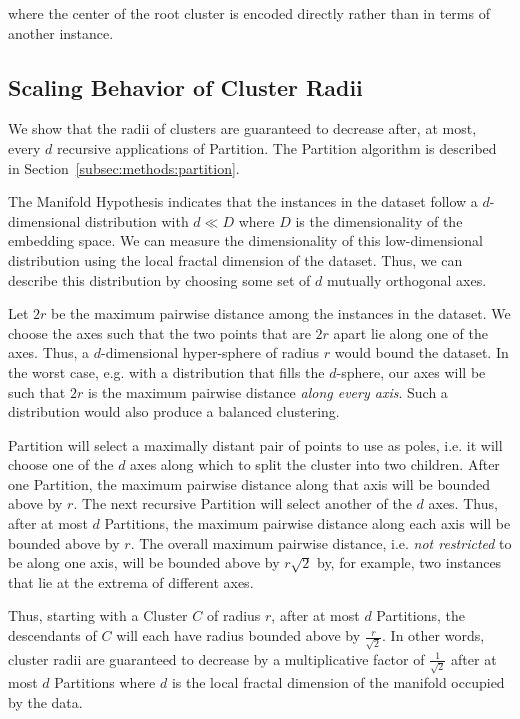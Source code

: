 where the center of the root cluster is encoded directly rather than in terms of another instance.


\subsection{Scaling Behavior of Cluster Radii}
\label{subsec:methods:radii-scaling-behavior}

We show that the radii of clusters are guaranteed to decrease after, at most, every $d$ recursive applications of Partition.
The Partition algorithm is described in Section~\ref{subsec:methods:partition}.

The Manifold Hypothesis indicates that the instances in the dataset follow a $d$-dimensional distribution with $d \ll D$ where $D$ is the dimensionality of the embedding space.
We can measure the dimensionality of this low-dimensional distribution using the local fractal dimension of the dataset.
Thus, we can describe this distribution by choosing some set of $d$ mutually orthogonal axes.

Let $2r$ be the maximum pairwise distance among the instances in the dataset.
We choose the axes such that the two points that are $2r$ apart lie along one of the axes.
Thus, a $d$-dimensional hyper-sphere of radius $r$ would bound the dataset.
In the worst case, e.g. with a distribution that fills the $d$-sphere, our axes will be such that $2r$ is the maximum pairwise distance \textit{along every axis}.
Such a distribution would also produce a balanced clustering.

Partition will select a maximally distant pair of points to use as poles, i.e. it will choose one of the $d$ axes along which to split the cluster into two children.
After one Partition, the maximum pairwise distance along that axis will be bounded above by $r$.
The next recursive Partition will select another of the $d$ axes.
Thus, after at most $d$ Partitions, the maximum pairwise distance along each axis will be bounded above by $r$.
The overall maximum pairwise distance, i.e. \textit{not restricted} to be along one axis, will be bounded above by $r \sqrt{2}$ by, for example, two instances that lie at the extrema of different axes.

Thus, starting with a Cluster $C$ of radius $r$, after at most $d$ Partitions, the descendants of $C$ will each have radius bounded above by $\frac{r}{\sqrt{2}}$.
In other words, cluster radii are guaranteed to decrease by a multiplicative factor of $\frac{1}{\sqrt{2}}$ after at most $d$ Partitions where $d$ is the local fractal dimension of the manifold occupied by the data.

